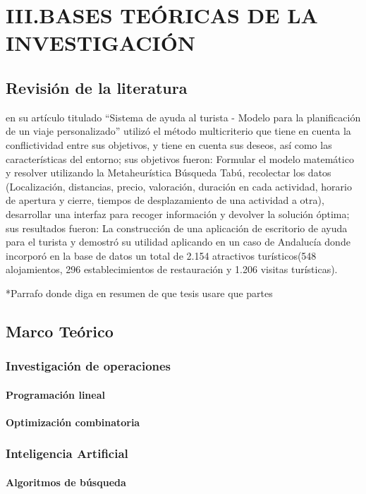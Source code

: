 \chapter{III.BASES TEÓRICAS DE LA INVESTIGACIÓN}
\section{Revisión de la literatura}
  en su artículo titulado “Sistema de ayuda al turista - Modelo para la planificación de un viaje personalizado” utilizó el método multicriterio que tiene en cuenta la conflictividad entre sus objetivos, y tiene en cuenta sus deseos, así como las características del entorno; sus objetivos fueron: Formular el modelo matemático y resolver utilizando la Metaheurística Búsqueda Tabú, recolectar los datos (Localización, distancias, precio, valoración, duración en cada actividad, horario de apertura y cierre, tiempos de desplazamiento de una actividad a otra), desarrollar una interfaz para recoger información y devolver la solución óptima; sus resultados fueron: La construcción de una aplicación de escritorio de ayuda para el turista y demostró su utilidad aplicando en un caso de Andalucía donde incorporó en la base de datos un total de 2.154 atractivos turísticos(548 alojamientos, 296 establecimientos de restauración y 1.206 visitas turísticas).

*Parrafo donde diga en resumen de que tesis usare que partes
\section{Marco Teórico}
\subsection{Investigación de operaciones}

\subsubsection{Programación lineal}
\subsubsection{Optimización combinatoria}

\subsection{Inteligencia Artificial}
\subsubsection{Algoritmos de búsqueda}
